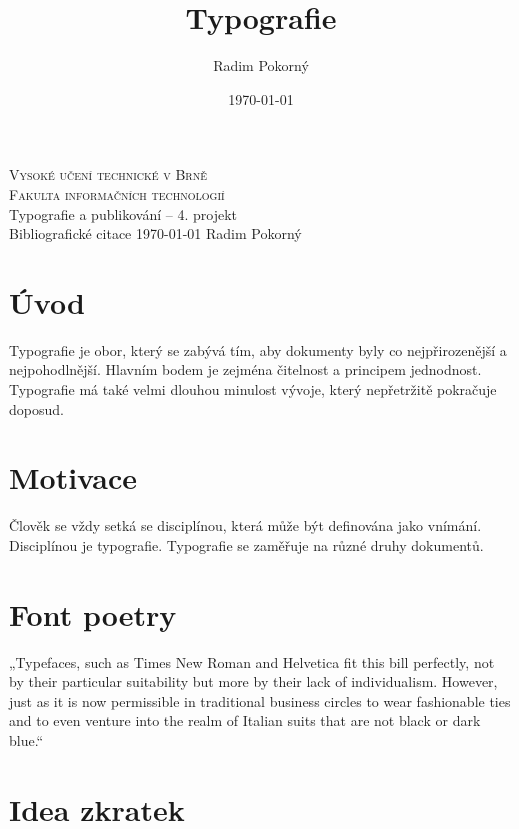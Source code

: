 \documentclass[12pt]{article}
\title{Typografie }
\author{Radim Pokorný}
\date{\today}
\begin{document}
\begin{titlepage}
    \begin{center}
        {\Huge\textsc{Vysoké učení technické v Brně}\\}
        \vspace{0.5em}
        {\huge \textsc{Fakulta informačních technologií}\\}
        \vfill
        \vspace{-5cm}
        {\LARGE Typografie a publikování – 4. projekt\\}
        \vspace{0.6em}
        {\Huge Bibliografické citace}
        \vfill
        \Large{\today} \hfill \Large{Radim Pokorný}
    \end{center}
\end{titlepage}

\section*{Úvod}

Typografie je obor, který se zabývá tím, aby dokumenty byly co nejpřirozenější a nejpohodlnější. 
Hlavním bodem je zejména čitelnost a principem jednodnost. Typografie má také velmi dlouhou minulost 
vývoje, který nepřetržitě pokračuje doposud.

\section*{Motivace}

Člověk se vždy setká se
disciplínou, která může být definována jako vnímání. Disciplínou je typografie.
Typografie se zaměřuje na různé
druhy dokumentů. \cite{typografie_odborny_text_2020}

\section*{Font poetry}

„Typefaces, such as Times New Roman and Helvetica
fit this bill perfectly, not by their particular suitability but
more by their lack of individualism.
However, just as it is now permissible in traditional business circles to wear fashionable ties and to
even venture into the realm of Italian suits that are
not black or dark blue.“ \cite{stop_sheep_find_type2014}

\section*{Idea zkratek}
\end{document}
